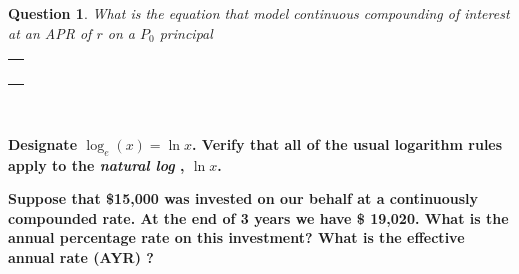 \documentclass[11pt]{amsart}
\newcommand{\ansbox}{
\begin{center}  
\begin{tabular}{|c|}        %
\hline
\hspace{4.5in} \\
\hspace{4.5in} \\
\hspace{4.5in} \\
\hspace{4.5in} \\
\hline
\end{tabular}\\
\end{center}}
\newtheorem*{quest}{Question}
\begin{document}
\begin{quest} What is the equation that model continuous compounding of interest at an APR of $r$ on a $P_0$ principal \end{quest}
\ansbox
\vspace{.5cm}

{\bf Designate $\log_e(x) = \ln x$.  Verify that all of the usual logarithm rules apply to the {\it natural log }, $\ln x$.  } 



\newpage 

{\bf Suppose that \$15,000 was invested on our behalf at a continuously compounded rate.   At the end of 3 years we have \$ 19,020.   What is the annual 
percentage rate on this investment?    What is the effective annual rate (AYR) ? } 
\end{document}
